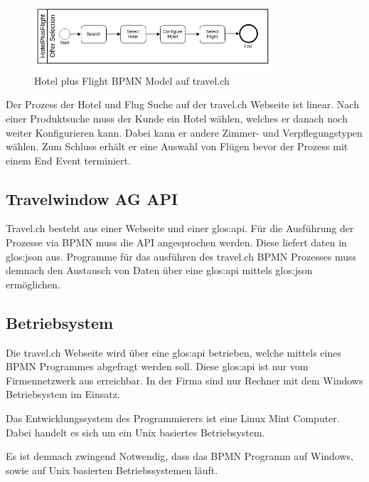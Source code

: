 \begin{figure}[H]
	\centering
	\includegraphics[width=0.8\textwidth]{images/hotelplusflight.png}
	\caption{Hotel plus Flight BPMN Model auf travel.ch}
	\label{fig:recherche:rahmenbedingungen:hotelplusflight}
\end{figure}
Der Prozess der Hotel und Flug Suche auf der travel.ch Webseite ist linear. Nach einer Produktsuche muss der Kunde ein Hotel wählen, welches er danach noch weiter Konfigurieren kann. Dabei kann er andere Zimmer- und Verpflegungstypen wählen. Zum Schluss erhält er eine Auswahl von Flügen bevor der Prozess mit einem End Event terminiert.

\subsection{Travelwindow AG API}
\label{sec:Recherche:rahmenbedingungen:api}
Travel.ch besteht aus einer Webseite und einer \Gls{glos:api}. Für die Ausführung der Prozesse via BPMN muss die API angesprochen werden. Diese liefert daten in \Gls{glos:json} aus. Programme für das ausführen des travel.ch BPMN Prozesses muss demnach den Austausch von Daten über eine \Gls{glos:api} mittels \Gls{glos:json} ermöglichen.

\subsection{Betriebsystem}
Die travel.ch Webseite wird über eine \Gls{glos:api} betrieben, welche mittels eines BPMN Programmes abgefragt werden soll. Diese \Gls{glos:api} ist nur vom Firmennetzwerk aus erreichbar. In der Firma sind nur Rechner mit dem Windows Betriebsystem im Einsatz.

Das Entwicklungssystem des Programmierers ist eine Linux Mint Computer. Dabei handelt es sich um ein Unix basiertes Betriebsystem.

Es ist demnach zwingend Notwendig, dass das BPMN Programm auf Windows, sowie auf Unix basierten Betriebssystemen läuft.

